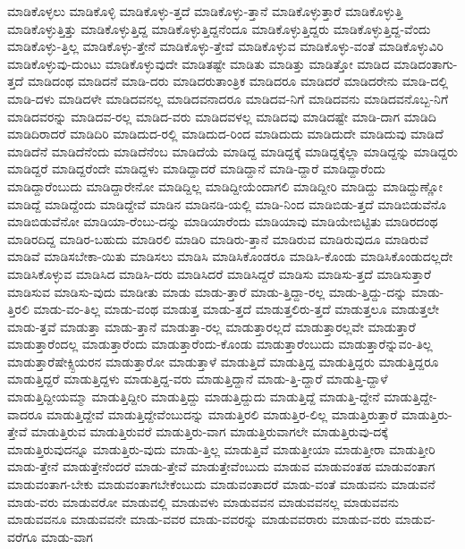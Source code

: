 {ಮಾಡಿಕೊಳ್ಳಲು
ಮಾಡಿಕೊಳ್ಳಿ
ಮಾಡಿಕೊಳ್ಳು-ತ್ತದೆ
ಮಾಡಿಕೊಳ್ಳು-ತ್ತಾನೆ
ಮಾಡಿಕೊಳ್ಳುತ್ತಾರೆ
ಮಾಡಿಕೊಳ್ಳುತ್ತಿ
ಮಾಡಿಕೊಳ್ಳುತ್ತಿತ್ತು
ಮಾಡಿಕೊಳ್ಳುತ್ತಿದ್ದ
ಮಾಡಿಕೊಳ್ಳುತ್ತಿದ್ದನೆಂದೂ
ಮಾಡಿಕೊಳ್ಳುತ್ತಿದ್ದರು
ಮಾಡಿಕೊಳ್ಳುತ್ತಿದ್ದ-ವೆಂದು
ಮಾಡಿಕೊಳ್ಳು-ತ್ತಿಲ್ಲ
ಮಾಡಿಕೊಳ್ಳು-ತ್ತೇನೆ
ಮಾಡಿಕೊಳ್ಳು-ತ್ತೇವೆ
ಮಾಡಿಕೊಳ್ಳುವ
ಮಾಡಿಕೊಳ್ಳು-ವಂತೆ
ಮಾಡಿಕೊಳ್ಳುವಿರಿ
ಮಾಡಿಕೊಳ್ಳುವು-ದುಂಟು
ಮಾಡಿಕೊಳ್ಳುವುದೇ
ಮಾಡಿತಷ್ಟೇ
ಮಾಡಿತು
ಮಾಡಿತ್ತು
ಮಾಡಿತ್ತೋ
ಮಾಡಿದ
ಮಾಡಿದಂತಾಗು-ತ್ತದೆ
ಮಾಡಿದಂಥ
ಮಾಡಿದನೆ
ಮಾಡಿ-ದರು
ಮಾಡಿದರುತಾಂತ್ರಿಕ
ಮಾಡಿದರೂ
ಮಾಡಿದರೆ
ಮಾಡಿದರೇನು
ಮಾಡಿ-ದಲ್ಲಿ
ಮಾಡಿ-ದಳು
ಮಾಡಿದಳೇ
ಮಾಡಿದವನಲ್ಲ
ಮಾಡಿದವನಾದರೂ
ಮಾಡಿದವ-ನಿಗೆ
ಮಾಡಿದವನು
ಮಾಡಿದವನೊಬ್ಬ-ನಿಗೆ
ಮಾಡಿದವರನ್ನು
ಮಾಡಿದವ-ರಲ್ಲ
ಮಾಡಿದ-ವರು
ಮಾಡಿದವಳಲ್ಲ
ಮಾಡಿದವು
ಮಾಡಿದಷ್ಟೇ
ಮಾಡಿ-ದಾಗ
ಮಾಡಿದಿ
ಮಾಡಿದಿರಾದರೆ
ಮಾಡಿದಿರಿ
ಮಾಡಿದುದ-ರಲ್ಲಿ
ಮಾಡಿದುದ-ರಿಂದ
ಮಾಡಿದುದು
ಮಾಡಿದುದೇ
ಮಾಡಿದುವು
ಮಾಡಿದೆ
ಮಾಡಿದೆನೆ
ಮಾಡಿದೆನೆಂದು
ಮಾಡಿದೆನೆಂಬ
ಮಾಡಿದೆಯೆ
ಮಾಡಿದ್ದ
ಮಾಡಿದ್ದಕ್ಕೆ
ಮಾಡಿದ್ದಕ್ಕೆಲ್ಲಾ
ಮಾಡಿದ್ದನ್ನು
ಮಾಡಿದ್ದರು
ಮಾಡಿದ್ದರೆ
ಮಾಡಿದ್ದರೆಂದೇ
ಮಾಡಿದ್ದಳು
ಮಾಡಿದ್ದಾದರೆ
ಮಾಡಿದ್ದಾನೆ
ಮಾಡಿ-ದ್ದಾರೆ
ಮಾಡಿದ್ದಾರೆಂದು
ಮಾಡಿದ್ದಾರೆಂಬುದು
ಮಾಡಿದ್ದಾರೇನೋ
ಮಾಡಿದ್ದಿಲ್ಲ
ಮಾಡಿದ್ದೀಯೆಂದಾಗಲಿ
ಮಾಡಿದ್ದೀರಿ
ಮಾಡಿದ್ದು
ಮಾಡಿದ್ದುಣ್ಣೋ
ಮಾಡಿದ್ದೆ
ಮಾಡಿದ್ದೆಂದು
ಮಾಡಿದ್ದೇವೆ
ಮಾಡಿನ
ಮಾಡಿನಡಿ-ಯಲ್ಲಿ
ಮಾಡಿ-ನಿಂದ
ಮಾಡಿಬಿಡು-ತ್ತದೆ
ಮಾಡಿಬಿಡುವೆನೊ
ಮಾಡಿಬಿಡುವೆನೋ
ಮಾಡಿಯಾ-ರೆಂಬು-ದನ್ನು
ಮಾಡಿಯಾರೆಂದು
ಮಾಡಿಯಾವು
ಮಾಡಿಯೇಬಿಟ್ಟಿತು
ಮಾಡಿರದಂಥ
ಮಾಡಿರದಿದ್ದ
ಮಾಡಿರ-ಬಹುದು
ಮಾಡಿರಲಿ
ಮಾಡಿರಿ
ಮಾಡಿರು-ತ್ತಾನೆ
ಮಾಡಿರುವ
ಮಾಡಿರುವುದೂ
ಮಾಡಿರುವೆ
ಮಾಡಿವೆ
ಮಾಡಿಸಬೇಕಾ-ಯಿತು
ಮಾಡಿಸಲು
ಮಾಡಿಸಿ
ಮಾಡಿಸಿಕೊಂಡರೂ
ಮಾಡಿಸಿ-ಕೊಂಡು
ಮಾಡಿಸಿಕೊಂಡುದಲ್ಲದೇ
ಮಾಡಿಸಿಕೊಳ್ಳುವ
ಮಾಡಿಸಿದ
ಮಾಡಿಸಿ-ದರು
ಮಾಡಿಸಿದರೆ
ಮಾಡಿಸಿದ್ದರೆ
ಮಾಡಿಸು
ಮಾಡಿಸು-ತ್ತದೆ
ಮಾಡಿಸುತ್ತಾರೆ
ಮಾಡಿಸುವ
ಮಾಡಿಸು-ವುದು
ಮಾಡೀತು
ಮಾಡು
ಮಾಡು-ತ್ತಾರೆ
ಮಾಡು-ತ್ತಿದ್ದಾ-ರಲ್ಲ
ಮಾಡು-ತ್ತಿದ್ದು-ದನ್ನು
ಮಾಡು-ತ್ತಿರಲಿ
ಮಾಡು-ವಂ-ತಿಲ್ಲ
ಮಾಡು-ವಂಥ
ಮಾಡುತ್ತ
ಮಾಡು-ತ್ತದೆ
ಮಾಡುತ್ತಲಿರು-ತ್ತದೆ
ಮಾಡುತ್ತಲೂ
ಮಾಡುತ್ತಲೇ
ಮಾಡು-ತ್ತವೆ
ಮಾಡುತ್ತಾ
ಮಾಡು-ತ್ತಾನೆ
ಮಾಡುತ್ತಾ-ರಲ್ಲ
ಮಾಡುತ್ತಾರಲ್ಲದೆ
ಮಾಡುತ್ತಾರಲ್ಲವೇ
ಮಾಡುತ್ತಾರೆ
ಮಾಡುತ್ತಾರೆಂದಲ್ಲ
ಮಾಡುತ್ತಾರೆಂದು
ಮಾಡುತ್ತಾರೆಂದು-ಕೊಂಡು
ಮಾಡುತ್ತಾರೆಂಬುದು
ಮಾಡುತ್ತಾರೆನ್ನುವಂ-ತಿಲ್ಲ
ಮಾಡುತ್ತಾರೆಷೇಕ್ಸ್ಪಿಯರನ
ಮಾಡುತ್ತಾರೋ
ಮಾಡುತ್ತಾಳೆ
ಮಾಡುತ್ತಿದೆ
ಮಾಡುತ್ತಿದ್ದ
ಮಾಡುತ್ತಿದ್ದರು
ಮಾಡುತ್ತಿದ್ದರೂ
ಮಾಡುತ್ತಿದ್ದರೆ
ಮಾಡುತ್ತಿದ್ದಳು
ಮಾಡುತ್ತಿದ್ದ-ವರು
ಮಾಡುತ್ತಿದ್ದಾನೆ
ಮಾಡು-ತ್ತಿ-ದ್ದಾರೆ
ಮಾಡುತ್ತಿ-ದ್ದಾಳೆ
ಮಾಡುತ್ತಿದ್ದೀಯಮ್ಮಾ
ಮಾಡುತ್ತಿದ್ದೀರಿ
ಮಾಡುತ್ತಿದ್ದು
ಮಾಡುತ್ತಿದ್ದುದು
ಮಾಡುತ್ತಿದ್ದೆ
ಮಾಡುತ್ತಿ-ದ್ದೇನೆ
ಮಾಡುತ್ತಿದ್ದೇ-ವಾದರೂ
ಮಾಡುತ್ತಿದ್ದೇವೆ
ಮಾಡುತ್ತಿದ್ದೇವೆಂಬುದನ್ನು
ಮಾಡುತ್ತಿರಲಿ
ಮಾಡುತ್ತಿರ-ಲಿಲ್ಲ
ಮಾಡುತ್ತಿರುತ್ತಾರೆ
ಮಾಡುತ್ತಿರು-ತ್ತೇವೆ
ಮಾಡುತ್ತಿರುವ
ಮಾಡುತ್ತಿರುವರೆ
ಮಾಡುತ್ತಿರು-ವಾಗ
ಮಾಡುತ್ತಿರುವಾಗಲೇ
ಮಾಡುತ್ತಿರುವು-ದಕ್ಕೆ
ಮಾಡುತ್ತಿರುವುದನ್ನೂ
ಮಾಡುತ್ತಿರು-ವುದು
ಮಾಡು-ತ್ತಿಲ್ಲ
ಮಾಡುತ್ತಿವೆ
ಮಾಡುತ್ತೀಯಾ
ಮಾಡುತ್ತೀರಾ
ಮಾಡುತ್ತೀರಿ
ಮಾಡು-ತ್ತೇನೆ
ಮಾಡುತ್ತೇನೆಂದರೆ
ಮಾಡು-ತ್ತೇವೆ
ಮಾಡುತ್ತೇವೆಂಬುದು
ಮಾಡುವ
ಮಾಡುವಂತಹ
ಮಾಡುವಂತಾಗ
ಮಾಡುವಂತಾಗ-ಬೇಕು
ಮಾಡುವಂತಾಗಬೇಕೆಂಬುದು
ಮಾಡುವಂತಾದರೆ
ಮಾಡು-ವಂತೆ
ಮಾಡುವನು
ಮಾಡುವನೆ
ಮಾಡು-ವರು
ಮಾಡುವರೋ
ಮಾಡುವಲ್ಲಿ
ಮಾಡುವಳು
ಮಾಡುವವನ
ಮಾಡುವವನಲ್ಲ
ಮಾಡುವವನು
ಮಾಡುವವನೂ
ಮಾಡುವವನೇ
ಮಾಡು-ವವರ
ಮಾಡು-ವವರನ್ನು
ಮಾಡುವವರಾರು
ಮಾಡುವ-ವರು
ಮಾಡುವ-ವರೆಗೂ
ಮಾಡು-ವಾಗ
}
